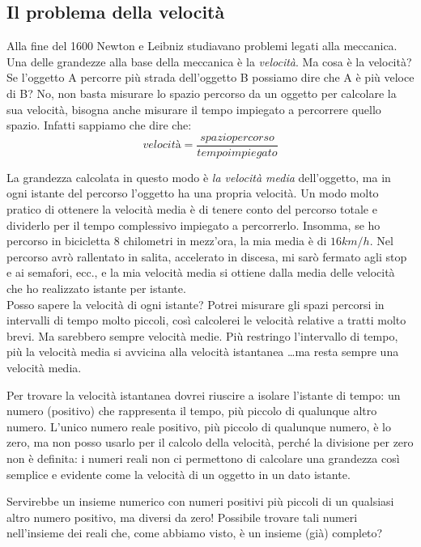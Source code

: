 \subsection{Il problema della velocità}
\label{subsec:insnum_velocita}

Alla fine del 1600 Newton e Leibniz studiavano problemi legati alla meccanica. 
Una delle grandezze alla base della meccanica è la \emph{velocità}. Ma cosa è 
la velocità? Se l'oggetto A percorre più strada dell'oggetto B possiamo dire 
che A è più veloce di B? No, non basta misurare lo spazio percorso da un 
oggetto per calcolare la sua velocità, bisogna anche misurare il tempo 
impiegato a percorrere quello spazio. Infatti sappiamo che dire che:
\[velocità = \frac{spazio percorso}{tempo impiegato}\]

La grandezza calcolata in questo modo è \emph{la velocità media} dell'oggetto, 
ma in ogni istante del percorso l'oggetto ha una propria velocità. 
Un modo molto pratico di ottenere la velocità media è di tenere conto 
del percorso totale e dividerlo per il tempo complessivo impiegato a percorrerlo.
Insomma, se ho percorso in bicicletta  \(8\) chilometri in mezz'ora, la mia media è 
di  \(16 km/h\). Nel percorso avrò rallentato in salita, accelerato in discesa, 
mi sarò fermato agli stop e ai semafori, ecc., e la mia velocità media si ottiene
dalla media delle velocità che ho realizzato istante per istante.\\
Posso sapere la velocità di ogni istante? Potrei misurare gli spazi percorsi in  
intervalli di tempo molto piccoli, così calcolerei le velocità relative a tratti 
molto brevi. Ma sarebbero sempre velocità medie. Più 
restringo l'intervallo di tempo, più la velocità media si avvicina alla 
velocità istantanea \dots ma resta sempre una velocità media.

Per trovare la velocità istantanea dovrei riuscire a isolare l'istante di tempo:
un numero (positivo) che rappresenta il tempo, più piccolo di qualunque altro numero.
L'unico numero reale positivo, più piccolo di qualunque numero, è lo zero, ma non posso
usarlo per il calcolo della velocità, perché la divisione per 
zero non è definita: i numeri reali non ci permettono di calcolare una 
grandezza così semplice e evidente come la velocità di un oggetto in un dato 
istante.

Servirebbe un insieme numerico con numeri positivi più piccoli di un 
qualsiasi altro numero positivo, ma diversi da zero! Possibile trovare tali numeri 
nell'insieme dei reali che, come abbiamo visto, è un insieme (già) completo?



